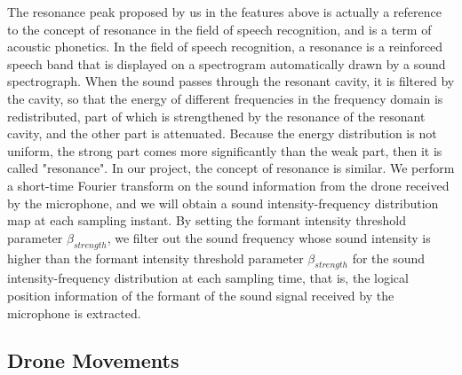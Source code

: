 \documentclass{sig-alternate-10pt}
\begin{document}
The resonance peak proposed by us in the features above is actually a reference to the concept of resonance in the field of speech recognition, and is a term of acoustic phonetics. In the field of speech recognition, a resonance is a reinforced speech band that is displayed on a spectrogram automatically drawn by a sound spectrograph. When the sound passes through the resonant cavity, it is filtered by the cavity, so that the energy of different frequencies in the frequency domain is redistributed, part of which is strengthened by the resonance of the resonant cavity, and the other part is attenuated. Because the energy distribution is not uniform, the strong part comes more significantly than the weak part, then it is called "resonance". In our project, the concept of resonance is similar. We perform a short-time Fourier transform on the sound information from the drone received by the microphone, and we will obtain a sound intensity-frequency distribution map at each sampling instant. By setting the formant intensity threshold parameter $\beta_{strength}$, we filter out the sound frequency whose sound intensity is higher than the formant intensity threshold parameter $\beta_{strength}$ for the sound intensity-frequency distribution at each sampling time, that is, the logical position information of the formant of the sound signal received by the microphone is extracted. 


\subsection{Drone Movements}
\end{document}
